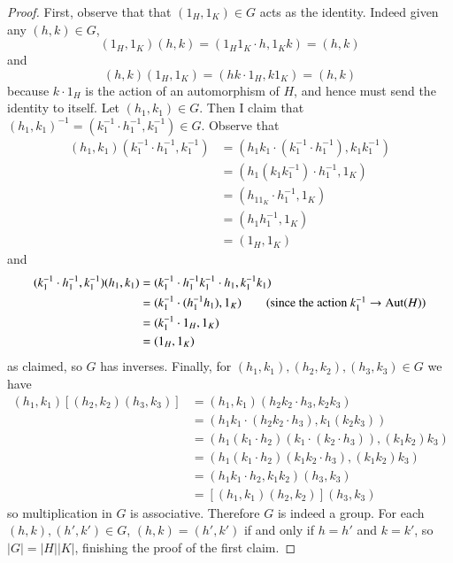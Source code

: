 \documentclass[12pt, a4paper, oneside, openright, titlepage]{book}
\begin{document}
\begin{proof}
    First, observe that that $(1_H,1_K) \in G$ acts as the identity. Indeed given any $(h,k) \in G$, \begin{equation*}
        (1_H,1_K)(h,k) = (1_H1_K\cdot h,1_Kk) = (h,k)
    \end{equation*}
    and \begin{equation*}
        (h,k)(1_H,1_K) = (hk\cdot 1_H, k1_K) = (h,k)
    \end{equation*}
    because $k\cdot1_H$ is the action of an automorphism of $H$, and hence must send the identity to itself. Let $(h_1,k_1) \in G$. Then I claim that $(h_1,k_1)^{-1} = (k_1^{-1}\cdot h_1^{-1},k_1^{-1}) \in G$. Observe that \begin{align*}
        (h_1,k_1)(k_1^{-1}\cdot h_1^{-1},k_1^{-1}) &= (h_1k_1\cdot(k_1^{-1}\cdot h_1^{-1}),k_1k_1^{-1}) \\
        &= (h_1(k_1k_1^{-1})\cdot h_1^{-1}, 1_K) \\
        &= (h_11_K\cdot h_1^{-1},1_K) \\
        &= (h_1h_1^{-1},1_K) \\
        &= (1_H,1_K)
    \end{align*}
    and \begin{align*}
        (k_1^{-1}\cdot h_1^{-1},k_1^{-1})(h_1,k_1) &= (k_1^{-1}\cdot h_1^{-1}k_1^{-1}\cdot h_1,k_1^{-1}k_1) \\
        &= (k_1^{-1}\cdot (h_1^{-1}h_1),1_K) \tag{since the action $k_1^{-1}\rightarrow\aut(H)$} \\
        &= (k_1^{-1}\cdot 1_H,1_K) \\
        &= (1_H,1_K)
    \end{align*}
    as claimed, so $G$ has inverses. Finally, for $(h_1,k_1),(h_2,k_2),(h_3,k_3) \in G$ we have \begin{align*}
        (h_1,k_1)[(h_2,k_2)(h_3,k_3)] &= (h_1,k_1)(h_2k_2\cdot h_3,k_2k_3) \\
        &= (h_1k_1\cdot(h_2k_2\cdot h_3), k_1(k_2k_3)) \\
        &= (h_1(k_1\cdot h_2)(k_1\cdot(k_2\cdot h_3)), (k_1k_2)k_3) \\
        &= (h_1(k_1\cdot h_2)(k_1k_2\cdot h_3),(k_1k_2)k_3) \\
        &= (h_1k_1\cdot h_2, k_1k_2)(h_3, k_3) \\
        &= [(h_1,k_1)(h_2,k_2)](h_3,k_3)
    \end{align*}
    so multiplication in $G$ is associative. Therefore $G$ is indeed a group. For each $(h,k), (h',k') \in G$, $(h,k) = (h',k')$ if and only if $h=h'$ and $k=k'$, so $|G| = |H||K|$, finishing the proof of the first claim.


\end{proof}
\end{document}

